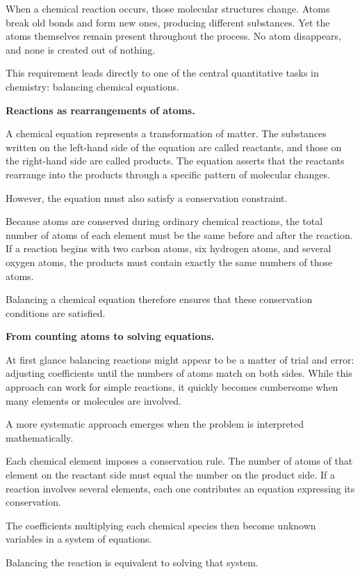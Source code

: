 \documentclass[11pt, openany]{book}
\theoremstyle{plain}
\theoremstyle{definition}
\theoremstyle{remark}
\begin{document}
When a chemical reaction occurs, those molecular structures change.
Atoms break old bonds and form new ones, producing different substances.
Yet the atoms themselves remain present throughout the process. No atom
disappears, and none is created out of nothing.

This requirement leads directly to one of the central quantitative tasks
in chemistry: balancing chemical equations.

\medskip

\textbf{Reactions as rearrangements of atoms.}

A chemical equation represents a transformation of matter. The
substances written on the left-hand side of the equation are called
reactants, and those on the right-hand side are called products. The
equation asserts that the reactants rearrange into the products through
a specific pattern of molecular changes.

However, the equation must also satisfy a conservation constraint.

Because atoms are conserved during ordinary chemical reactions, the
total number of atoms of each element must be the same before and after
the reaction. If a reaction begins with two carbon atoms, six hydrogen
atoms, and several oxygen atoms, the products must contain exactly the
same numbers of those atoms.

Balancing a chemical equation therefore ensures that these conservation
conditions are satisfied.

\medskip

\textbf{From counting atoms to solving equations.}

At first glance balancing reactions might appear to be a matter of trial
and error: adjusting coefficients until the numbers of atoms match on
both sides. While this approach can work for simple reactions, it
quickly becomes cumbersome when many elements or molecules are involved.

A more systematic approach emerges when the problem is interpreted
mathematically.

Each chemical element imposes a conservation rule. The number of atoms
of that element on the reactant side must equal the number on the
product side. If a reaction involves several elements, each one
contributes an equation expressing its conservation.

The coefficients multiplying each chemical species then become unknown
variables in a system of equations.

Balancing the reaction is equivalent to solving that system.
\end{document}
